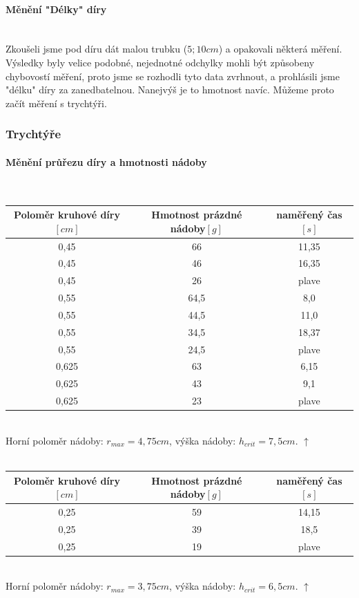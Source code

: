 \documentclass[14pt,a4paper]{article}
\begin{document}
\paragraph{Měnění "Délky" díry}\mbox{}
\\Zkoušeli jsme pod díru dát malou trubku ($5;10 cm$) a opakovali některá měření. Výsledky byly velice podobné, nejednotné odchylky mohli být způsobeny chybovostí měření, proto jsme se rozhodli tyto data zvrhnout, a prohlásili jsme "délku" díry za zanedbatelnou. Nanejvýš je to hmotnost navíc. Můžeme proto začít měření s trychtýři. 
\subsubsection{Trychtýře}
\label{mereni trychtyr}
\paragraph{Měnění průřezu díry a hmotnosti nádoby}\mbox{}\\
\begin{tabular}{|c|c|c|}
\hline 
Poloměr kruhové díry$[cm]$&Hmotnost prázdné nádoby$[g]$&naměřený čas $[s]$\\ 
\hline 
\hline 
0,45 & 66 & 11,35\\ 
\hline 
0,45 & 46 & 16,35\\ 
\hline 
0,45 & 26 & plave\\ 
\hline 
0,55 & 64,5 & 8,0\\ 
\hline 
0,55 & 44,5 & 11,0\\ 
\hline 
0,55 & 34,5 & 18,37\\ 
\hline 
0,55 & 24,5 & plave\\ 
\hline 
0,625 & 63 & 6,15\\ 
\hline 
0,625 & 43 & 9,1\\ 
\hline 
0,625 & 23 & plave\\ 
\hline 
\end{tabular}
\\Horní poloměr nádoby: $r_{max}=4,75cm$, výška nádoby: $h_{crit}=7,5cm$. $\uparrow$ \\\\
\begin{tabular}{|c|c|c|}
\hline 
Poloměr kruhové díry$[cm]$&Hmotnost prázdné nádoby$[g]$&naměřený čas $[s]$\\ 
\hline 
\hline 
0,25 & 59 & 14,15\\ 
\hline 
0,25 & 39 & 18,5\\ 
\hline 
0,25 & 19 & plave\\ 
\hline 
\end{tabular}
\\Horní poloměr nádoby: $r_{max}=3,75cm$, výška nádoby: $h_{crit}=6,5cm$. $\uparrow$
\newpage
\end{document}
